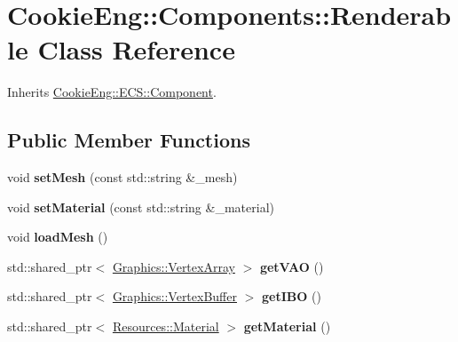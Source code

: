\hypertarget{class_cookie_eng_1_1_components_1_1_renderable}{}\section{Cookie\+Eng\+:\+:Components\+:\+:Renderable Class Reference}
\label{class_cookie_eng_1_1_components_1_1_renderable}


Inherits \hyperlink{class_cookie_eng_1_1_e_c_s_1_1_component}{Cookie\+Eng\+::\+E\+C\+S\+::\+Component}.

\subsection*{Public Member Functions}
\begin{DoxyCompactItemize}
\item 
\mbox{\label{class_cookie_eng_1_1_components_1_1_renderable_a4b9903e0bfb81ec574d022d7b2c198af}} 
void {\bfseries set\+Mesh} (const std\+::string \&\+\_\+mesh)
\item 
\mbox{\label{class_cookie_eng_1_1_components_1_1_renderable_a5ea9d1153bbe51b264c20102f8c72db9}} 
void {\bfseries set\+Material} (const std\+::string \&\+\_\+material)
\item 
\mbox{\label{class_cookie_eng_1_1_components_1_1_renderable_a8d51c4b3588d81811043a8cce0904c0d}} 
void {\bfseries load\+Mesh} ()
\item 
\mbox{\label{class_cookie_eng_1_1_components_1_1_renderable_a676d79c49c493b4a67a97aa3c3b5c25e}} 
std\+::shared\+\_\+ptr$<$ \hyperlink{class_cookie_eng_1_1_graphics_1_1_vertex_array}{Graphics\+::\+Vertex\+Array} $>$ {\bfseries get\+V\+AO} ()
\item 
\mbox{\label{class_cookie_eng_1_1_components_1_1_renderable_a57c744030c4b1271c7ceaeedd0c08533}} 
std\+::shared\+\_\+ptr$<$ \hyperlink{class_cookie_eng_1_1_graphics_1_1_vertex_buffer}{Graphics\+::\+Vertex\+Buffer} $>$ {\bfseries get\+I\+BO} ()
\item 
\mbox{\label{class_cookie_eng_1_1_components_1_1_renderable_a578ffbbc5b4245ade613d0dcfa571413}} 
std\+::shared\+\_\+ptr$<$ \hyperlink{class_cookie_eng_1_1_resources_1_1_material}{Resources\+::\+Material} $>$ {\bfseries get\+Material} ()
\end{DoxyCompactItemize}
